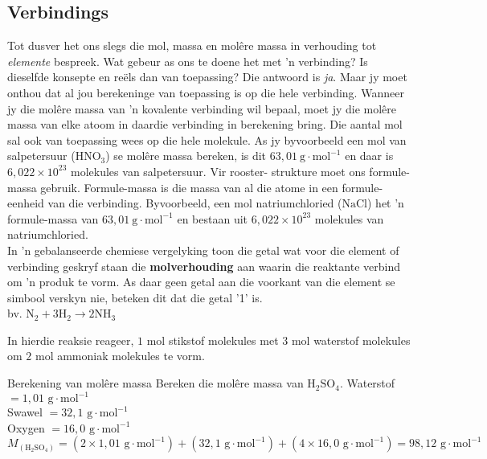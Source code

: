             \subsection*{Verbindings}
            \nopagebreak
Tot dusver het ons slegs die mol, massa en mol\^{e}re massa in verhouding tot \textsl{elemente} bespreek. Wat gebeur as ons te doene het met 'n verbinding? Is dieselfde konsepte en re\"{e}ls dan van toepassing? Die antwoord is \textsl{ja}. Maar jy moet onthou dat al jou berekeninge van toepassing is op die hele verbinding. Wanneer jy die mol\^{e}re massa van 'n kovalente verbinding wil bepaal, moet jy die mol\^{e}re massa van elke atoom in daardie verbinding in berekening bring. Die aantal mol sal ook van toepassing wees op die hele molekule. As jy byvoorbeeld een mol van salpetersuur ($\text{HNO}_{3}$) se molêre massa bereken, is dit $63,01~\text{g}\cdot{\text{mol}}^{-1}$ en daar is $6,022 \times 10^{23}$ molekules van salpetersuur. Vir rooster- strukture moet ons formule-massa gebruik. Formule-massa is die massa van al die atome in een formule-eenheid van die verbinding. Byvoorbeeld, een mol natriumchloried ($\text{NaCl}$) het 'n formule-massa van  $63,01~\text{g}\cdot{\text{mol}}^{-1}$ en bestaan uit $6,022 \times 10^{23}$ molekules van natriumchloried.\\
In 'n gebalanseerde chemiese vergelyking toon die getal wat voor die element of verbinding geskryf staan die \textbf{molverhouding} aan  waarin die reaktante verbind om 'n produk te vorm. As daar geen getal aan die voorkant van die element se simbool verskyn nie, beteken dit dat die getal '1' is.\\
      \label{m38717*id278442}bv. ${\text{N}}_{2}+3{\text{H}}_{2}\to 2\text{N}{\text{H}}_{3}$\par 
      \label{m38717*id278488}In hierdie reaksie reageer, $1$ mol stikstof molekules met $3$ mol waterstof molekules om $2$ mol  ammoniak molekules te vorm.
\label{m38717*secfhsst!!!underscore!!!id566}
      \begin{wex}{Berekening van mol\^{e}re massa}{
      \label{m38717*probfhsst!!!underscore!!!id567}
      \label{m38717*id278505}Bereken die molêre massa van $\text{H}_{2}\text{SO}_{4}$.
      }
{
Waterstof $=1,01 \text{ g} \cdot \text{mol}^{-1}$ \\ 
Swawel $=32,1\text{ g} \cdot \text{mol}^{-1}$ \\
Oxygen $=16,0 \text{ g} \cdot \text{mol}^{-1}$ 
      \label{m38717*id278632}\nopagebreak\noindent{}
    \begin{equation*}
    {M}_{(\text{H}_{2}\text{SO}_{4})}=(2 \times 1,01 \text{ g} \cdot \text{mol}^{-1}) + (32,1 \text{ g} \cdot \text{mol}^{-1}) + (4 \times 16,0 \text{ g} \cdot \text{mol}^{-1} ) = 98,12 \text{ g} \cdot \text{mol}^{-1}
      \end{equation*}
}
    \end{wex}
    \noindent

